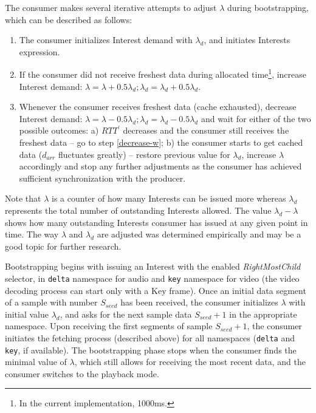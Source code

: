 \documentclass{icn/sig-alternate-2013} %
\newcommand{\wConcept}{Interest demand}
\begin{document}
The consumer makes several iterative attempts to adjust $\lambda$ during bootstrapping, which can be described as follows:
\begin{enumerate}
\item The consumer initializes \wConcept{} with $\lambda_d$, and initiates Interests expression.
\item If the consumer did not receive freshest data during allocated time\footnote{In the current implementation, 1000ms.}, increase \wConcept{}: $\lambda=\lambda+0.5\lambda_d; \lambda_d = \lambda_d+0.5\lambda_d$.
\item \label{decrease-w} Whenever the consumer receives freshest data (cache exhausted), decrease \wConcept{}: $\lambda=\lambda-0.5\lambda_d; \lambda_d = \lambda_d-0.5\lambda_d$ and wait for either of the two possible outcomes:
a) $RTT^\prime$ decreases and the consumer still receives the freshest data -- go to step \ref{decrease-w};
b) the consumer starts to get cached data ($d_{arr}$ fluctuates greatly) -- restore previous value for $\lambda_d$, increase $\lambda$ accordingly and stop any further adjustments as the consumer has achieved sufficient synchronization with the producer.
\end{enumerate}

Note that $\lambda$ is a counter of how many Interests can be issued more whereas $\lambda_d$ represents the total number of outstanding Interests allowed. The value $\lambda_d-\lambda$ shows how many outstanding Interests consumer has issued at any given point in time. The way $\lambda$ and $\lambda_d$ are adjusted was determined empirically and may be a good topic for further research.

Bootstrapping begins with issuing an Interest with the enabled \textit{RightMostChild} selector, in \texttt{delta} namespace for audio and \texttt{key} namespace for video (the video decoding process can start only with a Key frame). %
Once an initial data segment of a sample with number $S_{seed}$ has been received, the consumer initializes $\lambda$ with initial value $\lambda_d$, and asks for the next sample data $S_{seed}+1$ in the appropriate namespace. Upon receiving the first segments of sample $S_{seed}+1$, the consumer initiates the fetching process (described above) for all namespaces (\texttt{delta} and \texttt{key}, if available). The bootstrapping phase stops when the consumer finds the minimal value of $\lambda$, which still allows for receiving the most recent data, and the consumer switches to the playback mode.
\end{document}
